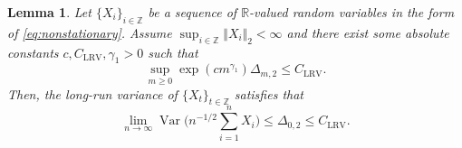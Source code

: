 \documentclass[11pt]{article}
\DeclareMathOperator*{\var}{Var}
\theoremstyle{plain}
\newtheorem{lemma}[theorem]{Lemma}
\theoremstyle{definition}
\begin{document}
\iffalse
\begin{lemma}\label{lemma:lrv_univar}
    Let $\{X_i\}_{i \in \mathbb{Z}}$ be a sequence of $\mathbb{R}$-valued random variables in the form of \eqref{eq:nonstationary}. Assume $\sup_{i \in \mathbb{Z}}\Vert X_i \Vert_2 < \infty$ and there exist some absolute constants $c, C_{\mathrm{LRV}}, \gamma_1 > 0$ such that
    \begin{equation*}
        \sup_{m \geq 0}\exp(cm^{\gamma_1})\Delta_{m,2} \leq C_{\mathrm{LRV}}.
    \end{equation*}
    Then, the long-run variance of $\{X_t\}_{t \in \mathbb{Z}}$ satisfies that
    \begin{equation*}
        \lim_{n \to \infty}\var\Big(n^{-1/2}\sum_{i = 1}^n X_i\Big) \leq \Delta_{0,2} \leq C_{\mathrm{LRV}}.
    \end{equation*}
\end{lemma}
\end{document}
